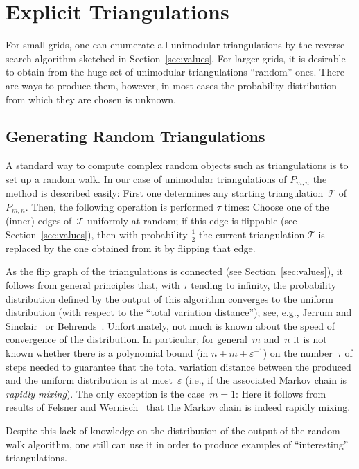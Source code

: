 \section{Explicit Triangulations}
\label{sec:trias}


For small grids, one can enumerate all unimodular triangulations by
the reverse search algorithm 
sketched in Section~\ref{sec:values}. For
larger grids, it is desirable to obtain from the huge set of
unimodular triangulations ``random'' ones. There are ways to produce
them, however, in most cases the probability distribution from which
they are chosen is unknown.

\subsection{Generating Random Triangulations}
\label{subsec:rw}
A standard way to compute complex random objects such as triangulations
is to set up a random walk. In our case of unimodular triangulations
of $P_{m,n}$ the method is described easily: First one determines any
starting triangulation~$\mathcal{T}$ of $P_{m,n}$. Then, the following
operation is performed $\tau$ times: Choose one of the (inner) edges
of~$\mathcal{T}$ uniformly at random; if this edge is flippable (see
Section~\ref{sec:values}), then with probability $\frac12$ the current
triangulation $\mathcal{T}$ is replaced by the one obtained
from it by flipping that edge.

As the flip graph of the triangulations is connected (see
Section~\ref{sec:values}), it follows from general principles that,
with $\tau$ tending to infinity, the probability distribution defined by
the output of this algorithm converges to the uniform distribution
(with respect to the ``total variation distance''); see, e.g., Jerrum
and Sinclair~\cite{JerrumSinclair} or Behrends~\cite{Behrends-MarkovChains}.
Unfortunately, not much is known about the speed of convergence of the
distribution. In particular, for general~$m$ and~$n$ it is not known
whether there is a polynomial bound (in $n+m+\varepsilon^{-1}$) on the number~$\tau$
of steps needed to guarantee that the total variation distance between
the produced and the uniform distribution is at most~$\varepsilon$ (i.e.,
if the associated Markov chain is \emph{rapidly mixing}).  The only
exception is the case~$m=1$: Here it follows from results of
Felsner and Wernisch~\cite{FelsnerWernisch} that the Markov chain is
indeed rapidly mixing.

Despite this lack of knowledge on the distribution of the output of
the  random walk algorithm, one still can use it in order to produce
examples of ``interesting'' triangulations.

